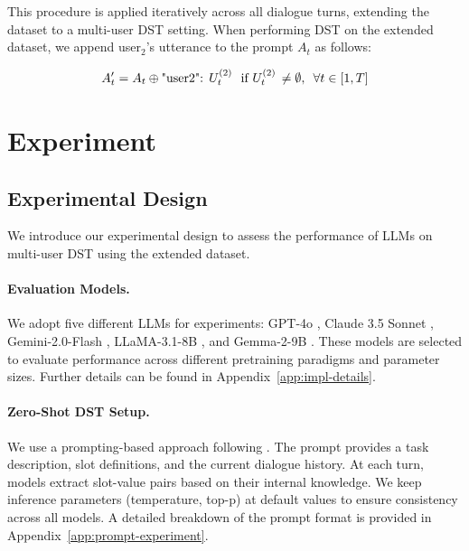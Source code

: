 \documentclass[11pt]{article}
\begin{document}
This procedure is applied iteratively across all dialogue turns, extending the dataset to a multi-user DST setting. When performing DST on the extended dataset, we append user$_2$’s utterance to the prompt $A_t$ as follows:


\begin{gather*}
A_t' = A_t \oplus \text{"user2": } U_t^{(2)} \thinspace\thinspace \text{ if } U_t^{(2)} \thinspace \neq \emptyset,\thinspace\thinspace\thinspace \forall t \in [1, T]
\end{gather*}

\section{Experiment}
\label{sec:experiment}

\subsection{Experimental Design}
\label{sec:experiment-evaluation}

We introduce our experimental design to assess the performance of LLMs on multi-user DST using the extended dataset. 

\paragraph{Evaluation Models.} We adopt five different LLMs for experiments: GPT-4o \cite{hurst2024gpt}, Claude 3.5 Sonnet \cite{anthropic2024claude35sonnet}, Gemini-2.0-Flash \cite{pichai2024gemini}, LLaMA-3.1-8B \cite{dubey2024llama}, and Gemma-2-9B \cite{team2024gemma}. These models are selected to evaluate performance across different pretraining paradigms and parameter sizes. Further details can be found in Appendix~\ref{app:impl-details}.

\paragraph{Zero-Shot DST Setup.} We use a prompting-based approach following \cite{heck2023chatgpt}. The prompt provides a task description, slot definitions, and the current dialogue history. At each turn, models extract slot-value pairs based on their internal knowledge. We keep inference parameters (temperature, top-p) at default values to ensure consistency across all models. A detailed breakdown of the prompt format is provided in Appendix~\ref{app:prompt-experiment}.
\end{document}
